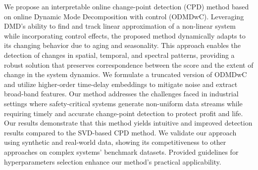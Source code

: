 We propose an interpretable online change-point detection (CPD) method based on online Dynamic Mode Decomposition with control (ODMDwC). Leveraging DMD's ability to find and track linear approximation of a non-linear system while incorporating control effects, the proposed method dynamically adapts to its changing behavior due to aging and seasonality. This approach enables the detection of changes in spatial, temporal, and spectral patterns, providing a robust solution that preserves correspondence between the score and the extent of change in the system dynamics. We formulate a truncated version of ODMDwC and utilize higher-order time-delay embeddings to mitigate noise and extract broad-band features. Our method addresses the challenges faced in industrial settings where safety-critical systems generate non-uniform data streams while requiring timely and accurate change-point detection to protect profit and life. Our results demonstrate that this method yields intuitive and improved detection results compared to the SVD-based CPD method. We validate our approach using synthetic and real-world data, showing its competitiveness to other approaches on complex systems' benchmark datasets. Provided guidelines for hyperparameters selection enhance our method's practical applicability.
